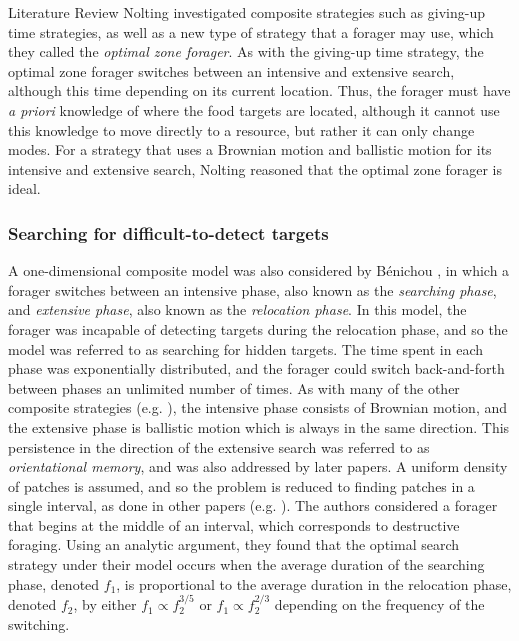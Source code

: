 \begin{section}{Literature Review \label{sec:litreview}}
Nolting \cite{Nolting_2013} investigated composite strategies such as giving-up time strategies, as well as a new type of strategy that a forager may use, which they called the \emph{optimal zone forager}.
As with the giving-up time strategy, the optimal zone forager switches between an intensive and extensive search, although this time depending on its current location.
Thus, the forager must have \emph{a priori} knowledge of where the food targets are located, although it cannot use this knowledge to move directly to a resource, but rather it can only change modes.
For a strategy that uses a Brownian motion and ballistic motion for its intensive and extensive search, Nolting reasoned that the optimal zone forager is ideal.

\subsubsection{Searching for difficult-to-detect targets}

A one-dimensional composite model was also considered by Bénichou \etal \cite{Benichou_2005}, in which a forager switches between an intensive phase, also known as the \emph{searching phase}, and \emph{extensive phase}, also known as the \emph{relocation phase}.
In this model, the forager was incapable of detecting targets during the relocation phase, and so the model was referred to as searching for hidden targets. 
The time spent in each phase was exponentially distributed, and the forager could switch back-and-forth between phases an unlimited number of times.
As with many of the other composite strategies (e.g. \cite{Plank_2008,Benhamou_2007}), the intensive phase consists of Brownian motion, and the extensive phase is ballistic motion which is always in the same direction.
This persistence in the direction of the extensive search was referred to as \emph{orientational memory}, and was also addressed by later papers.
A uniform density of patches is assumed, and so the problem is reduced to finding patches in a single interval, as done in other papers (e.g. \cite{Bartumeus_2013}).
The authors considered a forager that begins at the middle of an interval, which corresponds to destructive foraging.
Using an analytic argument, they found that the optimal search strategy under their model occurs when the average duration of the searching phase, denoted $f_1$, is proportional to the average duration in the relocation phase, denoted $f_2$, by either $f_1 \propto f_2^{3/5}$ or $f_1 \propto f_2^{2/3}$ depending on the frequency of the switching.


\end{section}
